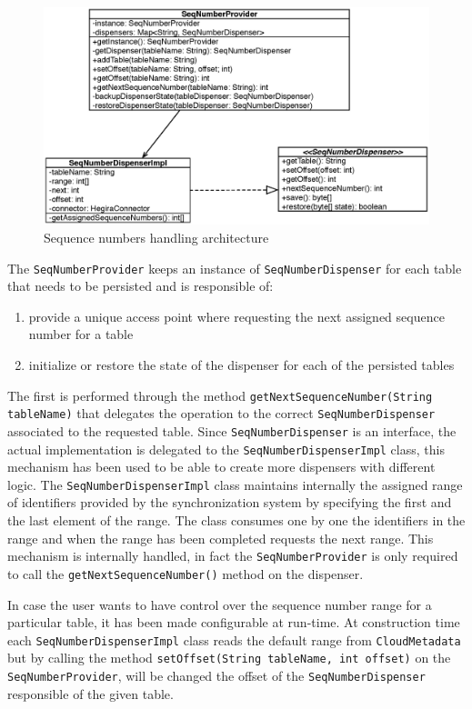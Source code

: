 \begin{figure}[tbh]
  \centering
  \includegraphics[width=12cm]{images/seq_provider}
  \caption{Sequence numbers handling architecture}
  \label{fig:seq-provider}
\end{figure} 

\noindent The \texttt{SeqNumberProvider} keeps an instance of \texttt{SeqNumberDispenser} for each table that needs to be persisted and is responsible of:
\begin{enumerate}
\item provide a unique access point where requesting the next assigned sequence number for a table
\item initialize or restore the state of the dispenser for each of the persisted tables
\end{enumerate}
\noindent The first is performed through the method \texttt{getNextSequenceNumber(String tableName)} that delegates the operation to the correct \texttt{SeqNumberDispenser} associated to the requested table.
Since \texttt{SeqNumberDispenser} is an interface, the actual implementation is delegated to the \texttt{SeqNumberDispenserImpl} class, this mechanism has been used to be able to create more dispensers with different logic.
\noindent The \texttt{SeqNumberDispenserImpl} class maintains internally the assigned range of identifiers provided by the synchronization system by specifying the first and the last element of the range. The class consumes one by one the identifiers in the range and when the range has been completed requests the next range. This mechanism is internally handled, in fact the \texttt{SeqNumberProvider} is only required to call the \texttt{getNextSequenceNumber()} method on the dispenser.

\noindent In case the user wants to have control over the sequence number range for a particular table, it has been made configurable at run-time. At construction time each \texttt{SeqNumberDispenserImpl}  class reads the default range from \texttt{CloudMetadata} but by calling the method \texttt{setOffset(String tableName, int offset)} on the \texttt{SeqNumberProvider}, will be changed the offset of the \texttt{SeqNumberDispenser} responsible of the given table.

